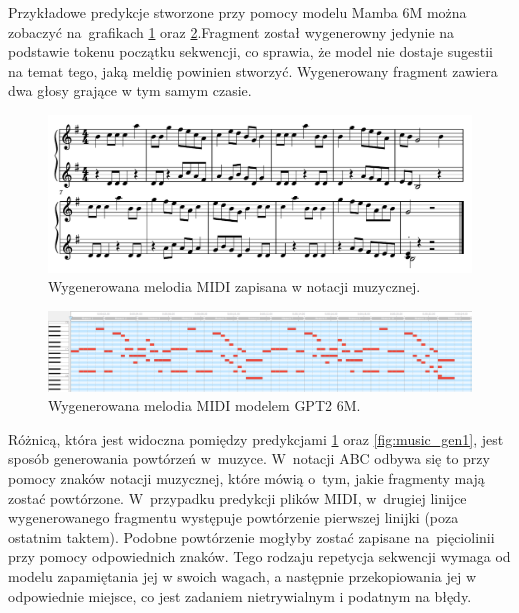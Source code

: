 \documentclass[data-science]{agh-wi} %
\begin{document}
Przykładowe predykcje stworzone przy pomocy modelu Mamba 6M można zobaczyć na~grafikach \ref*{fig:music_genMIDI_notes} oraz \ref*{fig:music_genMIDI}.Fragment został wygenerowny jedynie na podstawie tokenu początku sekwencji, co sprawia, że model nie dostaje sugestii na temat tego, jaką meldię powinien stworzyć. Wygenerowany fragment zawiera dwa głosy grające w tym samym czasie.

\begin{figure}[ht!]
    \begin{center}
        \includegraphics[width=0.9\linewidth]{./img/35.pdf}
    \end{center}
    \caption{Wygenerowana melodia MIDI zapisana w notacji muzycznej.}\label{fig:music_genMIDI_notes}
\end{figure}

\begin{figure}[ht!]
    \begin{center}
        \includegraphics[width=0.9\linewidth]{./img/midi_generated.png}
    \end{center}
    \caption{Wygenerowana melodia MIDI modelem GPT2 6M.}\label{fig:music_genMIDI}
\end{figure}

Różnicą, która jest widoczna pomiędzy predykcjami \ref*{fig:music_genMIDI_notes} oraz \ref*{fig:music_gen1}, jest sposób generowania powtórzeń w~muzyce. W~notacji ABC odbywa się to przy pomocy znaków notacji muzycznej, które mówią o~tym, jakie fragmenty mają zostać powtórzone. W~przypadku predykcji plików MIDI, w~drugiej linijce wygenerowanego fragmentu występuje powtórzenie pierwszej linijki (poza ostatnim taktem). Podobne powtórzenie mogłyby zostać zapisane na~pięciolinii przy pomocy odpowiednich znaków. Tego rodzaju repetycja sekwencji wymaga od modelu zapamiętania jej w swoich wagach, a następnie przekopiowania jej w odpowiednie miejsce, co jest zadaniem nietrywialnym i podatnym na błędy.
\end{document}
